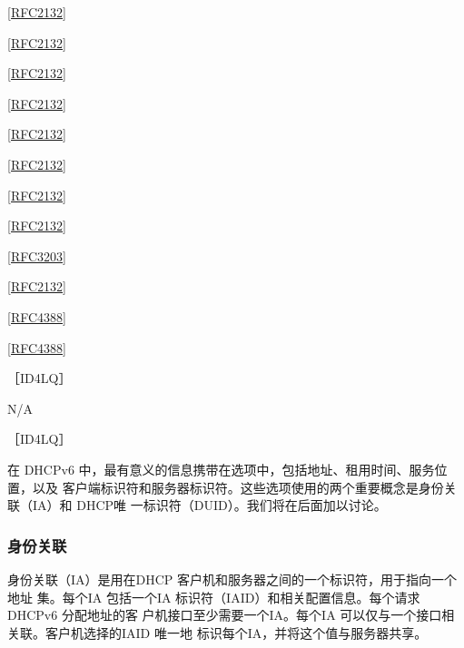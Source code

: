 \href{https://www.rfc-editor.org/rfc/rfc2132}{\href{https://www.rfc-editor.org/rfc/rfc2132}{[RFC2132]}}

\href{https://www.rfc-editor.org/rfc/rfc2132}{\href{https://www.rfc-editor.org/rfc/rfc2132}{[RFC2132]}}

\href{https://www.rfc-editor.org/rfc/rfc2132}{\href{https://www.rfc-editor.org/rfc/rfc2132}{[RFC2132]}}

\href{https://www.rfc-editor.org/rfc/rfc2132}{\href{https://www.rfc-editor.org/rfc/rfc2132}{[RFC2132]}}

\href{https://www.rfc-editor.org/rfc/rfc2132}{\href{https://www.rfc-editor.org/rfc/rfc2132}{[RFC2132]}}

\href{https://www.rfc-editor.org/rfc/rfc2132}{\href{https://www.rfc-editor.org/rfc/rfc2132}{[RFC2132]}}

\href{https://www.rfc-editor.org/rfc/rfc2132}{\href{https://www.rfc-editor.org/rfc/rfc2132}{[RFC2132]}}

\href{https://www.rfc-editor.org/rfc/rfc2132}{\href{https://www.rfc-editor.org/rfc/rfc2132}{[RFC2132]}}

\href{https://www.rfc-editor.org/rfc/rfc3203}{\href{https://www.rfc-editor.org/rfc/rfc3203}{[RFC3203]}}

\href{https://www.rfc-editor.org/rfc/rfc2132}{\href{https://www.rfc-editor.org/rfc/rfc2132}{[RFC2132]}}

\href{https://www.rfc-editor.org/rfc/rfc4388}{\href{https://www.rfc-editor.org/rfc/rfc4388}{[RFC4388]}}

\href{https://www.rfc-editor.org/rfc/rfc4388}{\href{https://www.rfc-editor.org/rfc/rfc4388}{[RFC4388]}}

［ID4LQ］

N/A

［ID4LQ］

在 DHCPv6 中，最有意义的信息携带在选项中，包括地址、租用时间、服务位置，以及
客户端标识符和服务器标识符。这些选项使用的两个重要概念是身份关联（IA）和 DHCP唯
一标识符（DUID）。我们将在后面加以讨论。

\subsubsection{身份关联}
身份关联（IA）是用在DHCP 客户机和服务器之间的一个标识符，用于指向一个地址
集。每个IA 包括一个IA 标识符（IAID）和相关配置信息。每个请求 DHCPv6 分配地址的客
户机接口至少需要一个IA。每个IA 可以仅与一个接口相关联。客户机选择的IAID 唯一地
标识每个IA，并将这个值与服务器共享。


